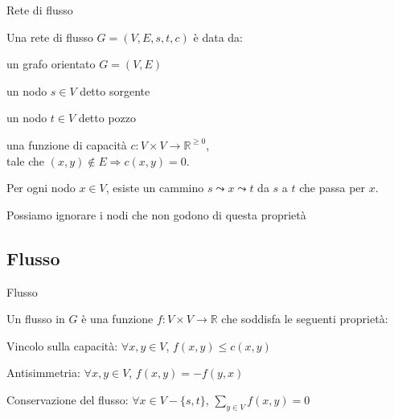 \begin{frame}{Rete di flusso}

\vspace{-9pt}
\begin{myboxtitle}[Definizione]
Una \alert{rete di flusso $G=(V,E,s,t,c)$} è data da:
\BI
\item un grafo orientato $G=(V,E)$
\item un nodo $s \in V$ detto \alert{sorgente}
\item un nodo $t \in V$ detto \alert{pozzo}
\item una funzione di \alert{capacità} $c: V \times V \rightarrow \mathbb{R}^{\geq 0}$,\\
tale che $(x,y) \not \in E \Rightarrow c(x,y)=0$.
\EI
\end{myboxtitle}

\begin{myboxtitle}[Assunzioni]
\BIL
\item Per ogni nodo $x \in V$, esiste un cammino $s \leadsto x \leadsto t$ 
da $s$ a $t$ che passa per $x$.
\item Possiamo ignorare i nodi che non godono di questa proprietà
\EIL
\end{myboxtitle}

\end{frame}







\subsection{Flusso}

\begin{frame}{Flusso}

\vspace{-9pt}
\begin{myboxtitle}[Flusso]
Un \alert{flusso} in $G$ è una funzione \alert{$f: V \times V \rightarrow \mathbb{R}$} 
che soddisfa le seguenti proprietà:
\BIL
\item \alert{Vincolo sulla capacità}: $\forall x,y \in V$, $f(x,y) \leq c(x,y)$

\item \alert{Antisimmetria}: $\forall x,y \in V$, $f(x,y) = -f(y,x)$

\item \alert{Conservazione del flusso}: $\forall x \in V-\{s,t\}$, 
$\sum_{y \in V} f(x,y) = 0$
\EIL
\end{myboxtitle}

\end{frame}

